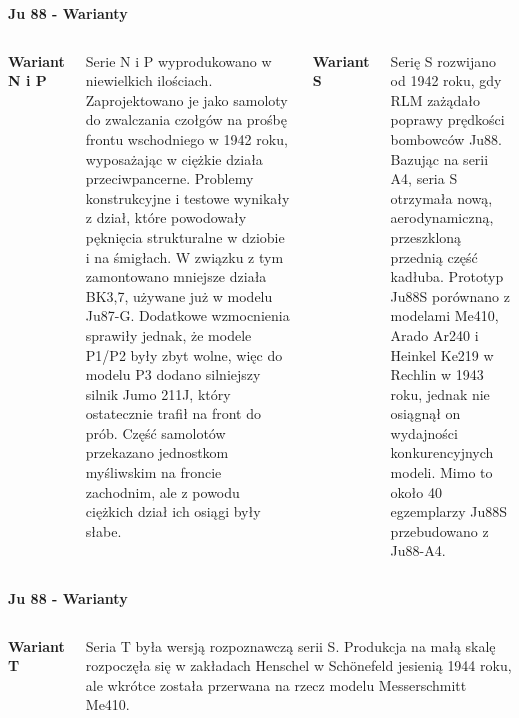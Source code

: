 
\begin{frame}[t]{\Huge{\textbf{Ju 88 - Warianty}}}
	\begin{columns}[t]

{\large{\textbf{Wariant N i P}}}	\\~\
	\justifying

Serie N i P wyprodukowano w niewielkich ilościach. Zaprojektowano je jako samoloty do zwalczania czołgów na prośbę frontu wschodniego w 1942 roku, wyposażając w ciężkie działa przeciwpancerne. Problemy konstrukcyjne i testowe wynikały z dział, które powodowały pęknięcia strukturalne w dziobie i na śmigłach. W związku z tym zamontowano mniejsze działa BK3,7, używane już w modelu Ju87-G. Dodatkowe wzmocnienia sprawiły jednak, że modele P1/P2 były zbyt wolne, więc do modelu P3 dodano silniejszy silnik Jumo 211J, który ostatecznie trafił na front do prób. Część samolotów przekazano jednostkom myśliwskim na froncie zachodnim, ale z powodu ciężkich dział ich osiągi były słabe. 

		
{\large{\textbf{Wariant S}}}	\\~\
	\justifying

Serię S rozwijano od 1942 roku, gdy RLM zażądało poprawy prędkości bombowców Ju88. Bazując na serii A4, seria S otrzymała nową, aerodynamiczną, przeszkloną przednią część kadłuba. Prototyp Ju88S porównano z modelami Me410, Arado Ar240 i Heinkel Ke219 w Rechlin w 1943 roku, jednak nie osiągnął on wydajności konkurencyjnych modeli. Mimo to około 40 egzemplarzy Ju88S przebudowano z Ju88-A4.

	\end{columns}
\end{frame}


\begin{frame}[t]{\Huge{\textbf{Ju 88 - Warianty}}}
	\begin{columns}[t]
		\column{0.5\textwidth} 

{\large{\textbf{Wariant T}}}	\\~\
	\justifying

Seria T była wersją rozpoznawczą serii S. Produkcja na małą skalę rozpoczęła się w zakładach Henschel w Schönefeld jesienią 1944 roku, ale wkrótce została przerwana na rzecz modelu Messerschmitt Me410.

	\end{columns}
\end{frame}